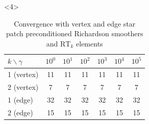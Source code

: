 \documentclass[presentation,aspectratio=43, 10pt]{beamer}
\newcommand{\convexpath}[2]{
  [
  create hullcoords/.code={
    \global\edef\namelist{#1}
    \foreach [count=\counter] \nodename in \namelist {
      \global\edef\numberofnodes{\counter}
      \coordinate (hullcoord\counter) at (\nodename);
    }
    \coordinate (hullcoord0) at (hullcoord\numberofnodes);
    \pgfmathtruncatemacro\lastnumber{\numberofnodes+1}
    \coordinate (hullcoord\lastnumber) at (hullcoord1);
  },
  create hullcoords
  ]
  ($(hullcoord1)!#2!-90:(hullcoord0)$)
  \foreach [
  evaluate=\currentnode as \previousnode using \currentnode-1,
  evaluate=\currentnode as \nextnode using \currentnode+1
  ] \currentnode in {1,...,\numberofnodes} {
    let \p1 = ($(hullcoord\currentnode) - (hullcoord\previousnode)$),
    \n1 = {atan2(\y1,\x1) + 90},
    \p2 = ($(hullcoord\nextnode) - (hullcoord\currentnode)$),
    \n2 = {atan2(\y2,\x2) + 90},
    \n{delta} = {Mod(\n2-\n1,360) - 360}
    in
    {arc [start angle=\n1, delta angle=\n{delta}, radius=#2]}
    -- ($(hullcoord\nextnode)!#2!-90:(hullcoord\currentnode)$)
  }
}
\begin{document}
\begin{frame}[fragile, t]
\begin{onlyenv}
\begin{columns}
\begin{column}{0.4\textwidth}
\begin{center}
        \end{center}
      \end{column}
    \end{columns}
  \end{onlyenv}
  \begin{onlyenv}<4>
    \begin{table}
      \centering
      {\footnotesize
      \begin{tabular}{l|cccccc}
        $k\backslash \gamma$ & $10^0$ & $10^1$ & $10^2$ & $10^3$ & $10^4$ & $10^5$ \\
        \hline
        1 (vertex)           & 11     & 11     & 11     & 11     & 11     & 11     \\
        2 (vertex)           & 7      & 7      & 7      & 7      & 7      & 7      \\
        1 (edge)             & 32     & 32     & 32     & 32     & 32     & 32     \\
        2 (edge)             & 15     & 15     & 15     & 15     & 15     & 15     \\
      \end{tabular}
      \caption{Convergence with vertex and edge star patch preconditioned Richardson
        smoothers and $\text{RT}_k$ elements}
      }
    \end{table}
  \end{onlyenv}
\end{frame}
\end{document}
